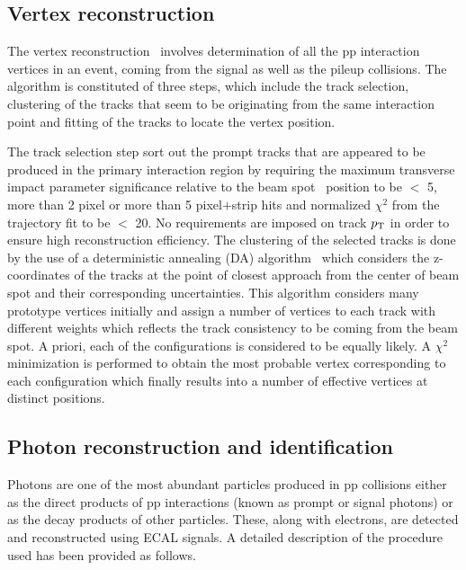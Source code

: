 \subsection{Vertex reconstruction}
The vertex reconstruction~\cite{Chatrchyan:2014fea} involves determination of all the
pp interaction vertices in an event, coming from the signal as well as the pileup collisions. 
The algorithm is constituted of three steps, which include the track selection, clustering of the tracks that seem to be originating from the same interaction point
and fitting of the tracks to locate the vertex position.

The track selection step sort out the prompt tracks that are appeared to be produced in the primary interaction region by requiring the maximum transverse
impact parameter significance relative to the beam spot~\cite{Miao:2007zz} position to be $<$ 5, more than 2 pixel or more than 5 pixel$+$strip hits and normalized
$\chi^{2}$ from the trajectory fit to be $<$ 20. No requirements are imposed on track $p_{\mathrm T}$ in order to ensure high reconstruction efficiency.
The clustering of the selected tracks is done by the use of a deterministic annealing (DA) algorithm~\cite{DAC_mech} which 
considers the z-coordinates of the tracks at the point of closest approach from the center of beam spot and their
corresponding uncertainties. This algorithm considers many prototype vertices initially and assign a number of vertices to each track with different weights
which reflects the track consistency to be coming from the beam spot.
A priori, each of the configurations is considered to be equally likely. A $\chi^{2}$ minimization 
is performed to obtain the most probable vertex corresponding to each configuration which finally results into a number of effective vertices at distinct positions.  
\subsection{Photon reconstruction and identification}
Photons are one of the most abundant particles produced in pp collisions either as the direct products of pp interactions (known as prompt or signal photons)
or as the decay products of other particles. These, along with electrons, are detected and reconstructed using ECAL signals.
A detailed description of the procedure used has been provided as follows.
